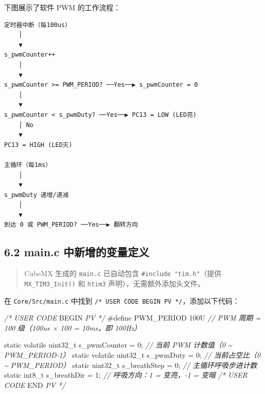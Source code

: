 \documentclass[
  chinese,
  UTF8,
  oneside,
  openany]{ctexbook}
\newenvironment{Shaded}{}{}
\newcommand{\BuiltInTok}[1]{\textcolor[rgb]{0.00,0.50,0.00}{#1}}
\newcommand{\CommentTok}[1]{\textcolor[rgb]{0.38,0.63,0.69}{\textit{#1}}}
\newcommand{\DataTypeTok}[1]{\textcolor[rgb]{0.56,0.13,0.00}{#1}}
\newcommand{\DecValTok}[1]{\textcolor[rgb]{0.25,0.63,0.44}{#1}}
\newcommand{\NormalTok}[1]{#1}
\newcommand{\OperatorTok}[1]{\textcolor[rgb]{0.40,0.40,0.40}{#1}}
\newcommand{\PreprocessorTok}[1]{\textcolor[rgb]{0.74,0.48,0.00}{#1}}
\newcommand{\RegionMarkerTok}[1]{#1}
\begin{document}
下图展示了软件 PWM 的工作流程：

\begin{verbatim}
定时器中断（每100us）
    │
    ▼
s_pwmCounter++
    │
    ▼
s_pwmCounter >= PWM_PERIOD? ──Yes──▶ s_pwmCounter = 0
    │
    ▼
s_pwmCounter < s_pwmDuty? ──Yes──▶ PC13 = LOW (LED亮)
    │ No
    ▼
PC13 = HIGH (LED灭)

主循环（每1ms）
    │
    ▼
s_pwmDuty 递增/递减
    │
    ▼
到达 0 或 PWM_PERIOD? ──Yes──▶ 翻转方向
\end{verbatim}

\subsection{6.2 main.c
中新增的变量定义}\label{main.c-ux4e2dux65b0ux589eux7684ux53d8ux91cfux5b9aux4e49}

\begin{quote}
CubeMX 生成的 \texttt{main.c} 已自动包含
\texttt{\#include\ "tim.h"}（提供 \texttt{MX\_TIM3\_Init()} 和
\texttt{htim3} 声明），无需额外添加头文件。
\end{quote}

在 \texttt{Core/Src/main.c} 中找到
\texttt{/*\ USER\ CODE\ BEGIN\ PV\ */}，添加以下代码：

\begin{Shaded}
\begin{Highlighting}[]
\CommentTok{/* USER CODE }\RegionMarkerTok{BEGIN}\CommentTok{ PV */}
\PreprocessorTok{\#define PWM\_PERIOD  }\DecValTok{100}\BuiltInTok{U}\PreprocessorTok{    }\CommentTok{// PWM 周期 = 100 级（100us × 100 = 10ms，即 100Hz）}

\DataTypeTok{static} \DataTypeTok{volatile} \DataTypeTok{uint32\_t}\NormalTok{ s\_pwmCounter }\OperatorTok{=} \DecValTok{0}\OperatorTok{;}  \CommentTok{// 当前 PWM 计数值（0 \textasciitilde{} PWM\_PERIOD{-}1）}
\DataTypeTok{static} \DataTypeTok{volatile} \DataTypeTok{uint32\_t}\NormalTok{ s\_pwmDuty    }\OperatorTok{=} \DecValTok{0}\OperatorTok{;}  \CommentTok{// 当前占空比（0 \textasciitilde{} PWM\_PERIOD）}
\DataTypeTok{static}          \DataTypeTok{uint32\_t}\NormalTok{ s\_breathStep }\OperatorTok{=} \DecValTok{0}\OperatorTok{;}  \CommentTok{// 主循环呼吸步进计数}
\DataTypeTok{static}          \DataTypeTok{int8\_t}\NormalTok{   s\_breathDir  }\OperatorTok{=} \DecValTok{1}\OperatorTok{;}  \CommentTok{// 呼吸方向：1 = 变亮，{-}1 = 变暗}
\CommentTok{/* USER CODE }\RegionMarkerTok{END}\CommentTok{ PV */}
\end{Highlighting}
\end{Shaded}
\end{document}
